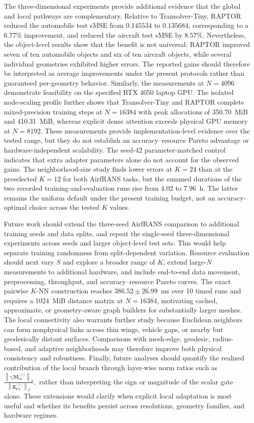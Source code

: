 \documentclass[a4paper,fleqn]{cas-sc}
\begin{document}
The three-dimensional experiments provide additional evidence that the
global and local pathways are complementary. Relative to Transolver-Tiny,
RAPTOR reduced the automobile test sMSE from \(0.145534\) to \(0.135684\),
corresponding to a \(6.77\%\) improvement, and reduced the aircraft test sMSE
by \(8.57\%\). Nevertheless, the object-level results show that the benefit
is not universal: RAPTOR improved seven of ten automobile objects and six of
ten aircraft objects, while several individual geometries exhibited higher
errors. The reported gains should therefore be interpreted as average
improvements under the present protocols rather than guaranteed
per-geometry behavior. Similarly, the measurements at \(N=4096\) demonstrate
feasibility on the specified RTX 4050 laptop GPU. The isolated node-scaling
profile further shows that Transolver-Tiny and RAPTOR complete mixed-precision
training steps at \(N=16384\) with peak allocations of 350.70~MiB and
410.31~MiB, whereas explicit dense attention exceeds physical GPU memory at
\(N=8192\). These measurements provide implementation-level evidence over
the tested range, but they do not establish an accuracy--resource Pareto
advantage or hardware-independent scalability. The seed-42
parameter-matched control indicates that extra adapter parameters
alone do not account for the observed gains. The neighborhood-size
study finds lower errors at \(K=24\) than at the preselected \(K=12\)
for both AirfRANS tasks, but the summed durations of the two recorded
training-and-evaluation runs rise from 4.02 to 7.96~h. The latter
remains the uniform default under the present training budget, not an
accuracy-optimal choice across the tested \(K\) values.

Future work should extend the three-seed AirfRANS comparison to additional
training seeds and data splits, and repeat the single-seed three-dimensional
experiments across seeds and larger object-level test sets. This would help
separate training randomness from split-dependent variation. Resource
evaluation should next vary \(S\) and explore a broader range of \(K\),
extend
large-\(N\) measurements to additional hardware, and include end-to-end data
movement, preprocessing, throughput, and accuracy--resource Pareto curves.
The exact pairwise \(K\)-NN construction reaches
\(386.52\pm26.99\)~ms over 10 timed runs and requires a 1024~MiB
distance matrix at \(N=16384\), motivating cached, approximate, or
geometry-aware graph builders for substantially larger meshes. The local
connectivity also warrants further study because Euclidean neighbors can
form nonphysical links across thin wings, vehicle gaps, or nearby but
geodesically distant surfaces. Comparisons with mesh-edge, geodesic,
radius-based, and adaptive neighborhoods may therefore improve both physical
consistency and robustness. Finally, future analyses should quantify the
realized contribution of the local branch through layer-wise norm ratios
such as $\frac{\left\|\gamma_l\mathbf{M}_{\mathrm{loc}}^{(l)}\right\|_F}
{\left\|\mathbf{Z}_{\mathrm{PA}}^{(l)}\right\|_F},$
rather than interpreting the sign or magnitude of the scalar gate alone.
These extensions would clarify when explicit local adaptation is most useful
and whether its benefits persist across resolutions, geometry families, and
hardware regimes.
\end{document}
